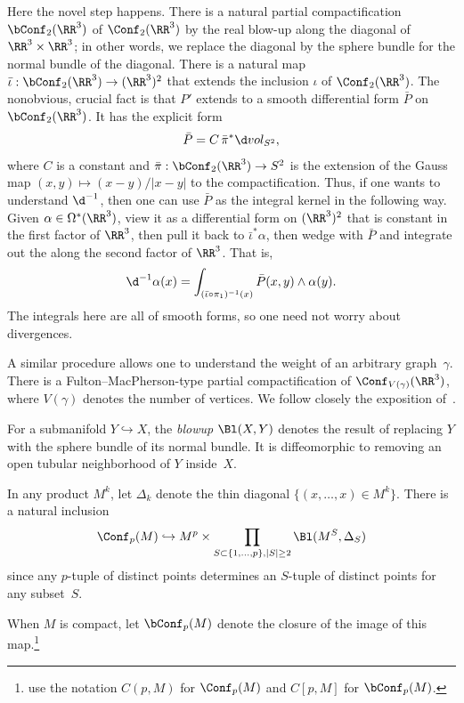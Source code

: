 \documentclass[10pt]{amsart}
\begin{document}
Here the novel step happens.
There is a natural partial compactification $\bConf_2(\RR^3)$ of $\Conf_2(\RR^3)$ by the real blow-up along the diagonal of $\RR^3 \times \RR^3$;
in other words, we replace the diagonal by the sphere bundle for the normal bundle of the diagonal.
There is a natural map $\bar{\iota}: \bConf_2(\RR^3) \to (\RR^3)^2$ that extends the inclusion $\iota$ of $\Conf_2(\RR^3)$.
The nonobvious, crucial fact is that $P'$ extends to a smooth differential form $\bar{P}$ on $\bConf_2(\RR^3)$.
It has the explicit form
\[
\bar{P} = C \, \bar{\pi}^* \d vol_{S^2} ,
\]
where $C$ is a constant and $\bar{\pi}: \bConf_2(\RR^3) \to S^2$ is the extension of the Gauss map $(x,y) \mapsto (x-y)/|x-y|$ to the compactification.
Thus, if one wants to understand $\d^{-1}$, 
then one can use $\bar{P}$ as the integral kernel in the following way.
Given $\alpha \in \Omega^*(\RR^3)$, view it as a differential form on $(\RR^3)^2$ that is constant in the first factor of $\RR^3$, then pull it back to $\bar{\iota}^* \alpha$, then wedge with $\bar{P}$ and integrate out the along the second factor of $\RR^3$.
That is,
\[
\d^{-1} \alpha (x) = \int_{(\bar{\iota} \circ \pi_1)^{-1}(x)} \bar{P}(x,y) \wedge \alpha(y).
\]
The integrals here are all of smooth forms, so one need not worry about divergences.

A similar procedure allows one to understand the weight of an arbitrary graph~$\gamma$.
There is a Fulton--MacPherson-type partial compactification of $\Conf_{V(\gamma)}(\RR^3)$,
where $V(\gamma)$ denotes the number of vertices.
We follow closely the exposition of~\cite{KMV}.

\begin{dfn}
For a submanifold $Y \hookrightarrow X$, the {\em blowup} $\Bl(X,Y)$ denotes the result of replacing $Y$ with the sphere bundle of its normal bundle. 
It is diffeomorphic to removing an open tubular neighborhood of $Y$ inside~$X$.
\end{dfn}

In any product $M^k$, let $\Delta_k$ denote the thin diagonal $\{(x,\ldots,x) \in M^k\}$.
There is a natural inclusion
\[
\Conf_p(M) \hookrightarrow M^p \times \prod_{S \subset \{1,\ldots,p\}, |S| \geq 2} \Bl(M^S,\Delta_S)
\]
since any $p$-tuple of distinct points determines an $S$-tuple of distinct points for any subset~$S$.

\begin{dfn}
When $M$ is compact, let $\bConf_p(M)$ denote the closure of the image of this map.\footnote{\cite{KMV} use the notation $C(p,M)$ for $\Conf_p(M)$ and $C[p,M]$ for $\bConf_p(M)$.}
\end{dfn}
\end{document}
